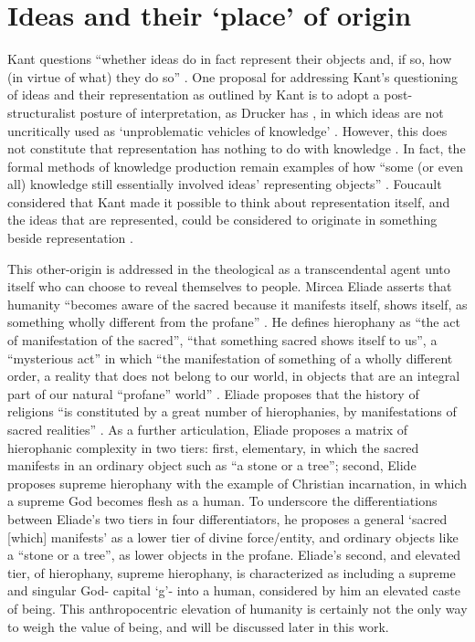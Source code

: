 \section{Ideas and their ‘place’ of origin }
Kant questions ``whether ideas do in fact represent their objects and, if so, how (in virtue of what) they do so” \citep{gutting_michel_2022}. One proposal for addressing Kant’s questioning of ideas and their representation as outlined by Kant is to adopt a post-structuralist posture of interpretation, as Drucker has \citep[p. 177-185]{drucker_graphesis_2014}, in which ideas are not uncritically used as `unproblematic vehicles of knowledge’ \citep{gutting_michel_2022}. However, this does not constitute that representation has nothing to do with knowledge \citep{gutting_michel_2022}. In fact, the formal methods of knowledge production remain examples of how ``some (or even all) knowledge still essentially involved ideas’ representing objects” \citep{gutting_michel_2022}. Foucault considered that Kant made it possible to think about representation itself, and the ideas that are represented, could be considered to originate in something beside representation \citep{gutting_michel_2022}.

This other-origin is addressed in the theological as a transcendental agent unto itself who can choose to reveal themselves to people. Mircea Eliade asserts that humanity ``becomes aware of the sacred because it manifests itself, shows itself, as something wholly different from the profane” \citep[p. 11]{eliade_sacred_1987}. He defines hierophany as ``the act of manifestation of the sacred”, ``that something sacred shows itself to us”, a ``mysterious act” in which “the manifestation of something of a wholly different order, a reality that does not belong to our world, in objects that are an integral part of our natural ``profane” world” \citep[p. 11]{eliade_sacred_1987}. Eliade proposes that the history of religions ``is constituted by a great number of hierophanies, by manifestations of sacred realities” \citep[p. 11]{eliade_sacred_1987}. As a further articulation, Eliade proposes a matrix of hierophanic complexity in two tiers: first, elementary, in which the sacred manifests in an ordinary object such as ``a stone or a tree”; second, Elide proposes supreme hierophany with the example of Christian incarnation, in which a supreme God becomes flesh as a human. To underscore the differentiations between Eliade’s two tiers in four differentiators, he proposes a general ‘sacred [which] manifests’ as a lower tier of divine force/entity, and ordinary objects like a ``stone or a tree”, as lower objects in the profane. Eliade’s second, and elevated tier, of hierophany, supreme hierophany, is characterized as including a supreme and singular God- capital `g’- into a human, considered by him an elevated caste of being. This anthropocentric elevation of humanity is certainly not the only way to weigh the value of being, and will be discussed later in this work. 


